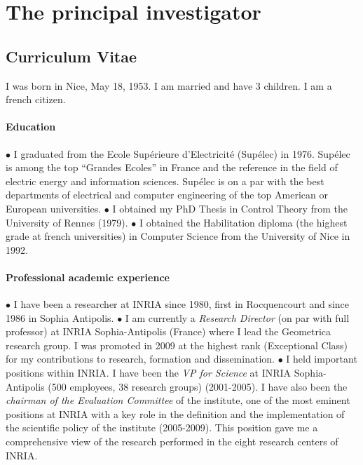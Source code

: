 \section{The principal investigator}

\subsection{Curriculum Vitae}

I was born in Nice, May 18, 1953. I am married and have 3 children. I am a french citizen.

\paragraph{Education}\mbox{}

$\bullet$ I graduated from the Ecole Sup\'erieure d'Electricit\'e (Sup\'elec) in 1976.  Sup\'elec is among the top ``Grandes Ecoles'' in France and the reference in the field of electric energy and information sciences. Sup\'elec is on a par with the best departments of electrical and computer engineering of the top American or European universities.
$\bullet$
I obtained my PhD Thesis in Control Theory from the University of Rennes (1979). 
$\bullet$
I obtained the Habilitation diploma (the highest grade at french universities) in Computer Science from the  University of Nice in 1992.

\paragraph{Professional academic experience}\mbox{}

 $\bullet$ I have been a researcher at INRIA since 1980, first in Rocquencourt and since 1986 in Sophia Antipolis.  $\bullet$  I am currently a {\em Research Director} (on par with full professor) at INRIA Sophia-Antipolis (France) where I lead the Geometrica research group. I was promoted in 2009 at the highest rank (Exceptional Class) for my contributions to research, formation and dissemination. $\bullet$ I held important positions within INRIA. I have been 
the {\em VP for Science}  at INRIA Sophia-Antipolis (500 employees, 38 research groups) (2001-2005). 
I have also been  the {\em chairman of the Evaluation Committee} of the institute, one of the most eminent positions at INRIA with a key role in the definition and the implementation
of the scientific policy of the institute (2005-2009).  This position gave me  a comprehensive view of the research performed in the eight research centers of INRIA.



